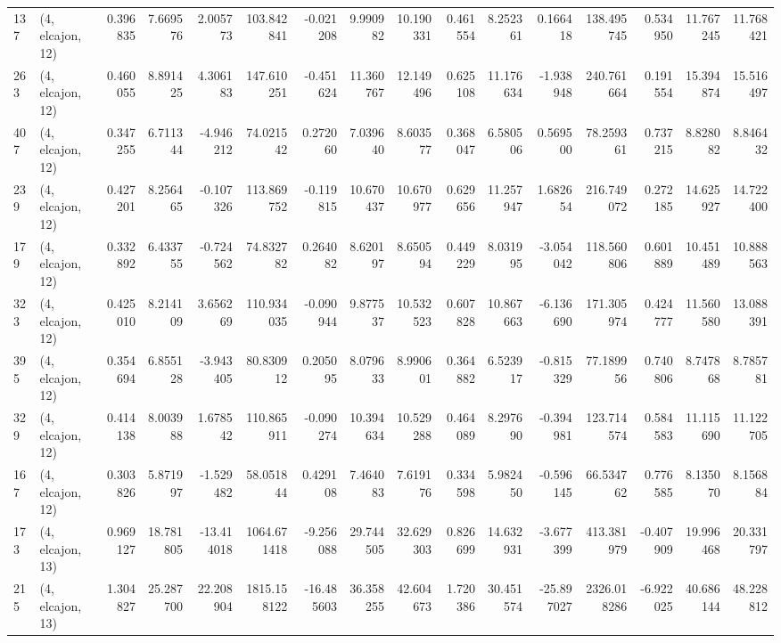 \begin{tabular}{llrrrrrrrrrrrrrr}
137 &  (4, elcajon, 12) &   0.396835 &   7.669576 &   2.005773 &   103.842841 &  -0.021208 &   9.990982 &  10.190331 &  0.461554 &   8.252361 &   0.166418 &   138.495745 &   0.534950 &  11.767245 &  11.768421 \\
263 &  (4, elcajon, 12) &   0.460055 &   8.891425 &   4.306183 &   147.610251 &  -0.451624 &  11.360767 &  12.149496 &  0.625108 &  11.176634 &  -1.938948 &   240.761664 &   0.191554 &  15.394874 &  15.516497 \\
407 &  (4, elcajon, 12) &   0.347255 &   6.711344 &  -4.946212 &    74.021542 &   0.272060 &   7.039640 &   8.603577 &  0.368047 &   6.580506 &   0.569500 &    78.259361 &   0.737215 &   8.828082 &   8.846432 \\
239 &  (4, elcajon, 12) &   0.427201 &   8.256465 &  -0.107326 &   113.869752 &  -0.119815 &  10.670437 &  10.670977 &  0.629656 &  11.257947 &   1.682654 &   216.749072 &   0.272185 &  14.625927 &  14.722400 \\
179 &  (4, elcajon, 12) &   0.332892 &   6.433755 &  -0.724562 &    74.832782 &   0.264082 &   8.620197 &   8.650594 &  0.449229 &   8.031995 &  -3.054042 &   118.560806 &   0.601889 &  10.451489 &  10.888563 \\
323 &  (4, elcajon, 12) &   0.425010 &   8.214109 &   3.656269 &   110.934035 &  -0.090944 &   9.877537 &  10.532523 &  0.607828 &  10.867663 &  -6.136690 &   171.305974 &   0.424777 &  11.560580 &  13.088391 \\
395 &  (4, elcajon, 12) &   0.354694 &   6.855128 &  -3.943405 &    80.830912 &   0.205095 &   8.079633 &   8.990601 &  0.364882 &   6.523917 &  -0.815329 &    77.189956 &   0.740806 &   8.747868 &   8.785781 \\
329 &  (4, elcajon, 12) &   0.414138 &   8.003988 &   1.678542 &   110.865911 &  -0.090274 &  10.394634 &  10.529288 &  0.464089 &   8.297690 &  -0.394981 &   123.714574 &   0.584583 &  11.115690 &  11.122705 \\
167 &  (4, elcajon, 12) &   0.303826 &   5.871997 &  -1.529482 &    58.051844 &   0.429108 &   7.464083 &   7.619176 &  0.334598 &   5.982450 &  -0.596145 &    66.534762 &   0.776585 &   8.135070 &   8.156884 \\
173 &  (4, elcajon, 13) &   0.969127 &  18.781805 & -13.414018 &  1064.671418 &  -9.256088 &  29.744505 &  32.629303 &  0.826699 &  14.632931 &  -3.677399 &   413.381979 &  -0.407909 &  19.996468 &  20.331797 \\
215 &  (4, elcajon, 13) &   1.304827 &  25.287700 &  22.208904 &  1815.158122 & -16.485603 &  36.358255 &  42.604673 &  1.720386 &  30.451574 & -25.897027 &  2326.018286 &  -6.922025 &  40.686144 &  48.228812 \\

\end{tabular}
